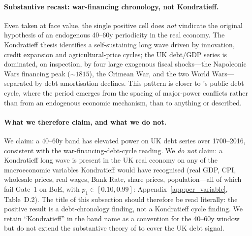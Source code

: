 \paragraph{Substantive recast: war-financing chronology, not
Kondratieff.}
Even taken at face value, the single positive cell does
\emph{not} vindicate the original \citet{kondratieff1925}
hypothesis of an endogenous 40--60y periodicity in the real
economy. The Kondratieff thesis identifies a self-sustaining
long wave driven by innovation, credit expansion and
agricultural-price cycles; the UK debt/GDP series is dominated,
on inspection, by four large exogenous fiscal shocks---the
Napoleonic Wars financing peak (\(\sim 1815\)), the Crimean
War, and the two World Wars---separated by debt-amortisation
declines. This pattern is closer to
\citet{reinhart_rogoff2009}'s public-debt cycle, where the
period emerges from the spacing of major-power conflicts rather
than from an endogenous economic mechanism, than to anything
\citet{kondratieff1925} or \citet{schumpeter1939} described.

\paragraph{What we therefore claim, and what we do not.}
We claim: a 40--60y band has elevated power on UK debt
series over 1700--2016, consistent with the
\citet{reinhart_rogoff2009} war-financing-debt-cycle reading.
We \emph{do not} claim: a Kondratieff long wave is present in
the UK real economy on any of the macroeconomic variables
Kondratieff would have recognised (real GDP, CPI, wholesale
prices, real wages, Bank Rate, share prices, population---all
of which fail Gate~1 on BoE, with \(p_1\in[0.10,0.99]\):
Appendix~\ref{app:per_variable}, Table~D.2). The title of this
subsection should therefore be read literally: the positive
result is a debt-chronology finding, not a Kondratieff cycle
finding. We retain ``Kondratieff'' in the band name as a
convention for the 40--60y window but do not extend the
substantive theory of \citet{kondratieff1925} to cover the UK
debt signal.

